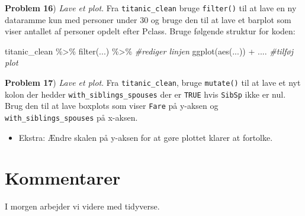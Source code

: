 \documentclass[
]{book}
\newenvironment{Shaded}{\begin{snugshade}}{\end{snugshade}}
\newcommand{\CommentTok}[1]{\textcolor[rgb]{0.56,0.35,0.01}{\textit{#1}}}
\newcommand{\FunctionTok}[1]{\textcolor[rgb]{0.00,0.00,0.00}{#1}}
\newcommand{\NormalTok}[1]{#1}
\newcommand{\SpecialCharTok}[1]{\textcolor[rgb]{0.00,0.00,0.00}{#1}}
\providecommand{\tightlist}{%
  \setlength{\itemsep}{0pt}\setlength{\parskip}{0pt}}
\begin{document}
\textbf{Problem 16}) \emph{Lave et plot}. Fra \texttt{titanic\_clean} bruge \texttt{filter()} til at lave en ny dataramme kun med personer under 30 og bruge den til at lave et barplot som viser antallet af personer opdelt efter Pclass. Bruge følgende struktur for koden:

\begin{Shaded}
\begin{Highlighting}[]
\NormalTok{titanic\_clean }\SpecialCharTok{\%\textgreater{}\%} 
  \FunctionTok{filter}\NormalTok{(...) }\SpecialCharTok{\%\textgreater{}\%} \CommentTok{\#rediger linjen}
  \FunctionTok{ggplot}\NormalTok{(}\FunctionTok{aes}\NormalTok{(...)) }\SpecialCharTok{+}\NormalTok{ .... }\CommentTok{\#tilføj plot}
\end{Highlighting}
\end{Shaded}

\textbf{Problem 17}) \emph{Lave et plot}. Fra \texttt{titanic\_clean}, bruge \texttt{mutate()} til at lave et nyt kolon der hedder \texttt{with\_siblings\_spouses} der er \texttt{TRUE} hvis \texttt{SibSp} ikke er nul. Brug den til at lave boxplots som viser \texttt{Fare} på y-aksen og \texttt{with\_siblings\_spouses} på x-aksen.

\begin{itemize}
\tightlist
\item
  Ekstra: Ændre skalen på y-aksen for at gøre plottet klarer at fortolke.
\end{itemize}

\hypertarget{kommentarer}{%
\section{Kommentarer}\label{kommentarer}}

I morgen arbejder vi videre med tidyverse.

  
\end{document}
